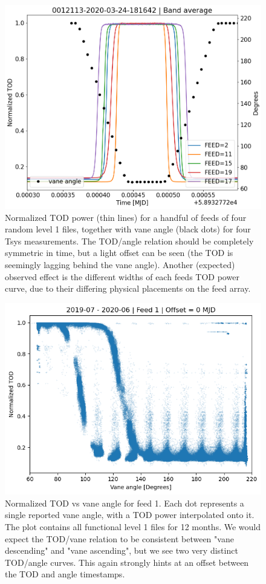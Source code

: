 \documentclass[10pt, a4paper]{article}
\begin{document}
\begin{figure}[H]
    \includegraphics[scale=0.34]{../plots/tod_angle_0012113-2020-03-24-181642.png}
    \caption{Normalized TOD power (thin lines) for a handful of feeds of four random level 1 files, together with vane angle (black dots) for four Tsys measurements. The TOD/angle relation should be completely symmetric in time, but a light offset can be seen (the TOD is seemingly lagging behind the vane angle). Another (expected) observed effect is the different widths of each feeds TOD power curve, due to their differing physical placements on the feed array.}
    \label{fig:tod_angle}
\end{figure}

\begin{figure}[H]
    \centering
    \includegraphics[scale=0.6]{../plots/power_angle_all_0.png}
    \caption{Normalized TOD vs vane angle for feed 1. Each dot represents a single reported vane angle, with a TOD power interpolated onto it. The plot contains all functional level 1 files for 12 months. We would expect the TOD/vane relation to be consistent between "vane descending" and "vane ascending", but we see two very distinct TOD/angle curves. This again strongly hints at an offset between the TOD and angle timestamps.}
    \label{fig:tod_angle_scatter}
\end{figure}
\end{document}
